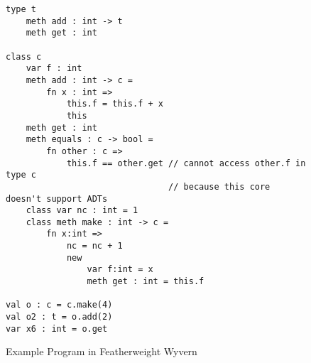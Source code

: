 \begin{figure}[t]
  \centering
\begin{lstlisting}
type t
	meth add : int -> t
	meth get : int
	
class c
	var f : int
	meth add : int -> c =
		fn x : int =>
			this.f = this.f + x
			this
	meth get : int
	meth equals : c -> bool =
		fn other : c =>
			this.f == other.get // cannot access other.f in type c
								// because this core doesn't support ADTs
	class var nc : int = 1
	class meth make : int -> c =
		fn x:int =>
			nc = nc + 1
			new
				var f:int = x
				meth get : int = this.f
			
val o : c = c.make(4)
val o2 : t = o.add(2)
var x6 : int = o.get
\end{lstlisting}
\caption{Example Program in Featherweight Wyvern}
\label{f-core3-example}
\end{figure}
